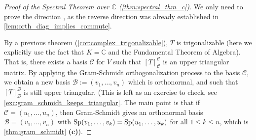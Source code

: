 \begin{proof}[Proof of the Spectral Theorem over $\mathbb{C}$ (\cref{thm:spectral_thm_c})]
We only need to prove the direction , as the reverse direction was already established in \cref{lem:orth_diag_implies_commute}.

By a previous theorem (\cref{cor:complex_trigonalizable}), $T$ is trigonalizable (here we explicitly use the fact that $K = \mathbb{C}$ and the Fundamental Theorem of Algebra). That is, there exists a basis $\mathcal{C}$ for $V$ such that $[T]_{\mathcal{C}}^{\mathcal{C}}$ is an upper triangular matrix.
By applying the Gram-Schmidt orthogonalization process to the basis $\mathcal{C}$, we obtain a new basis $\mathcal{B} := (v_1, \dots, v_n)$ which is orthonormal, and such that $[T]_{\mathcal{B}}^{\mathcal{B}}$ is still upper triangular. (This is left as an exercise to check, see \cref{exc:gram_schmidt_keeps_triangular}. The main point is that if $\mathcal{C} = (u_1, \dots, u_n)$, then Gram-Schmidt gives an orthonormal basis $\mathcal{B} = (v_1, \dots, v_n)$ with $\operatorname{Sp}(v_1, \dots, v_k) = \operatorname{Sp}(u_1, \dots, u_k)$ for all $1 \leq k \leq n$, which is \cref{thm:gram_schmidt} \textbf{(c)}).


\end{proof}
